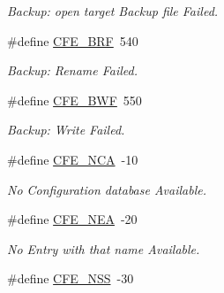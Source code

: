 \begin{CompactItemize}
\begin{CompactList}\small\item\em Backup: open target Backup file Failed. \item\end{CompactList}\item 
\hypertarget{group__errors_gee4caa017da2daf88aa192647f5ebaba}{
\#define \hyperlink{group__errors_gee4caa017da2daf88aa192647f5ebaba}{CFE\_\-BRF}~540}
\label{group__errors_gee4caa017da2daf88aa192647f5ebaba}

\begin{CompactList}\small\item\em Backup: Rename Failed. \item\end{CompactList}\item 
\hypertarget{group__errors_g58992d0fae72c0a93a8fb1ec9cc1cd9c}{
\#define \hyperlink{group__errors_g58992d0fae72c0a93a8fb1ec9cc1cd9c}{CFE\_\-BWF}~550}
\label{group__errors_g58992d0fae72c0a93a8fb1ec9cc1cd9c}

\begin{CompactList}\small\item\em Backup: Write Failed. \item\end{CompactList}\item 
\hypertarget{group__errors_gf8cd36471ddcc549668f49238855609d}{
\#define \hyperlink{group__errors_gf8cd36471ddcc549668f49238855609d}{CFE\_\-NCA}~-10}
\label{group__errors_gf8cd36471ddcc549668f49238855609d}

\begin{CompactList}\small\item\em No Configuration database Available. \item\end{CompactList}\item 
\hypertarget{group__errors_g7f7e54a5ccefa34556fe6da3b35b4f27}{
\#define \hyperlink{group__errors_g7f7e54a5ccefa34556fe6da3b35b4f27}{CFE\_\-NEA}~-20}
\label{group__errors_g7f7e54a5ccefa34556fe6da3b35b4f27}

\begin{CompactList}\small\item\em No Entry with that name Available. \item\end{CompactList}\item 
\hypertarget{group__errors_g5db4a12696dff1db26958db1be075be9}{
\#define \hyperlink{group__errors_g5db4a12696dff1db26958db1be075be9}{CFE\_\-NSS}~-30}
\label{group__errors_g5db4a12696dff1db26958db1be075be9}


\end{CompactItemize}
